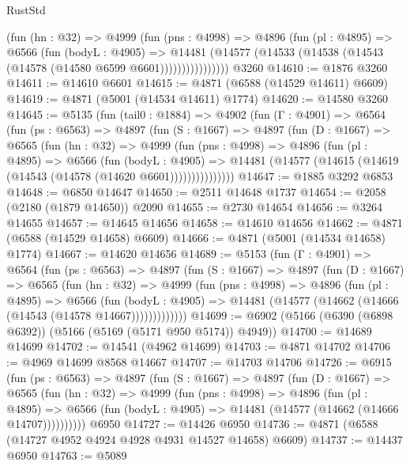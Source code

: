 \begin{lexlean}{RustStd}
\begin{coremodule}
                (fun (hn : @32) =>
                @4999
                  (fun (pns : @4998) =>
                  @4896
                    (fun (pl : @4895) =>
                    @6566
                      (fun (bodyL : @4905) =>
                      @14481
                        (@14577 (@14533 (@14538 (@14543 (@14578 (@14580 @6599 @6601))))))))))))))))
    @3260
@14610 := @1876 @3260
@14611 := @14610 @6601
@14615 := @4871 (@6588 (@14529 @14611) @6609)
@14619 := @4871 (@5001 (@14534 @14611) @1774)
@14620 := @14580 @3260
@14645 := @5135
    (fun (tail0 : @1884) =>
    @4902
      (fun (Γ : @4901) =>
      @6564
        (fun (ps : @6563) =>
        @4897
          (fun (S : @1667) =>
          @4897
            (fun (D : @1667) =>
            @6565
              (fun (hn : @32) =>
              @4999
                (fun (pns : @4998) =>
                @4896
                  (fun (pl : @4895) =>
                  @6566
                    (fun (bodyL : @4905) =>
                    @14481 (@14577 (@14615 (@14619 (@14543 (@14578 (@14620 @6601)))))))))))))))
@14647 := @1885 @3292 @6853
@14648 := @6850 @14647
@14650 := @2511 @14648 @1737
@14654 := @2058 (@2180 (@1879 @14650)) @2090
@14655 := @2730 @14654
@14656 := @3264 @14655
@14657 := @14645 @14656
@14658 := @14610 @14656
@14662 := @4871 (@6588 (@14529 @14658) @6609)
@14666 := @4871 (@5001 (@14534 @14658) @1774)
@14667 := @14620 @14656
@14689 := @5153
    (fun (Γ : @4901) =>
    @6564
      (fun (ps : @6563) =>
      @4897
        (fun (S : @1667) =>
        @4897
          (fun (D : @1667) =>
          @6565
            (fun (hn : @32) =>
            @4999
              (fun (pns : @4998) =>
              @4896
                (fun (pl : @4895) =>
                @6566
                  (fun (bodyL : @4905) =>
                  @14481 (@14577 (@14662 (@14666 (@14543 (@14578 @14667)))))))))))))
@14699 := @6902 (@5166 (@6390 (@6898 @6392)) (@5166 (@5169 (@5171 @950 @5174)) @4949))
@14700 := @14689 @14699
@14702 := @14541 (@4962 @14699)
@14703 := @4871 @14702
@14706 := @4969 @14699 @8568 @14667
@14707 := @14703 @14706
@14726 := @6915
    (fun (ps : @6563) =>
    @4897
      (fun (S : @1667) =>
      @4897
        (fun (D : @1667) =>
        @6565
          (fun (hn : @32) =>
          @4999
            (fun (pns : @4998) =>
            @4896
              (fun (pl : @4895) =>
              @6566 (fun (bodyL : @4905) => @14481 (@14577 (@14662 (@14666 @14707))))))))))
    @6950
@14727 := @14426 @6950
@14736 := @4871 (@6588 (@14727 @4952 @4924 @4928 @4931 @14527 @14658) @6609)
@14737 := @14437 @6950
@14763 := @5089

\end{coremodule}
\end{lexlean}

